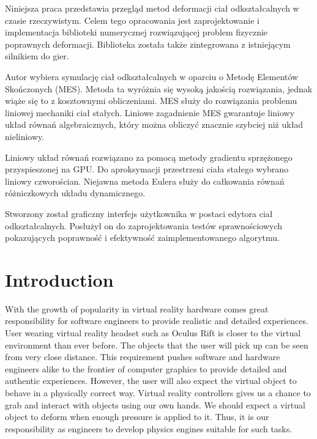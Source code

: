 \documentclass[en]{minipw} %
\begin{document}
\begin{streszczenie}
Niniejsza praca przedstawia przegląd metod deformacji ciał odkształcalnych w czasie rzeczywistym. Celem tego opracowania jest zaprojektowanie i implementacja biblioteki numerycznej rozwiązującej problem fizycznie poprawnych deformacji. Biblioteka została także zintegrowana z istniejącym silnikiem do gier. 

Autor wybiera symulację ciał odkształcalnych w oparciu o Metodę Elementów Skończonych (MES). Metoda ta wyróżnia się wysoką jakością rozwiązania, jednak wiąże się to z kosztownymi obliczeniami. MES służy do rozwiązania problemu liniowej mechaniki ciał stałych. Liniowe zagadnienie MES gwarantuje liniowy układ równań algebraicznych, który można obliczyć znacznie szybciej niż układ nieliniowy. 

Liniowy układ równań rozwiązano za pomocą metody gradientu sprzężonego przyspieszonej na GPU. Do aproksymacji przestrzeni ciała stałego wybrano liniowy czworościan. Niejawna metoda Eulera służy do całkowania równań różniczkowych układu dynamicznego.

Stworzony został graficzny interfejs użytkownika w postaci edytora ciał odkształcalnych. Posłużył on do zaprojektowania testów sprawnościowych pokazujących poprawność i efektywność zaimplementowanego algorytmu.

\end{streszczenie}


\makestatement


\cleardoublepage
\tableofcontents


\cleardoublepage
\pagestyle{fancy}

\chapter*{Introduction}
With the growth of popularity in virtual reality hardware comes great responsibility for software engineers to provide realistic and detailed experiences. User wearing virtual reality headset such as Oculus Rift is closer to the virtual environment than ever before. The objects that the user will pick up can be seen from very close distance. This requirement pushes software and hardware engineers alike to the frontier of computer graphics to provide detailed and authentic experiences. However, the user will also expect the virtual object to behave in a physically correct way. Virtual reality controllers gives us a chance to grab and interact with objects using our own hands. We should expect a virtual object to deform when enough pressure is applied to it. Thus, it is our responsibility as engineers to develop physics engines suitable for such tasks.
\end{document}
